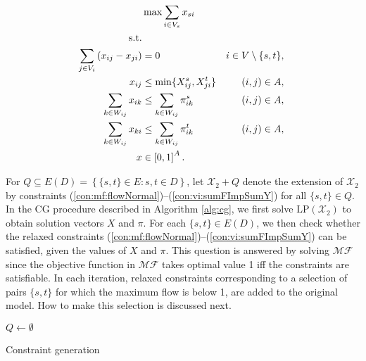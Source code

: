 \begin{subequations}\label{eq:mf}
\begin{align}
\label{objective:maxf} &\max\sum\limits_{i \in V_s} x_{si} \\ 
\text{s.t.}  \notag   \\
\label{con:maxf:flowNormal}  \sum\limits_{\substack{ j\in V_i}}\left(x_{ij}-x_{ji}\right) & = 0 & i\in V\setminus\{s,t\},\\
\label{con:maxf:fcapst}   x_{ij} &\leq \min\{X_{ij}^s, X_{ji}^t\}     &  (i,j)\in A,  \\ 	 
\label{con:maxf:sumFImpSumYst} \sum_{k\in W_{ij}}x_{ik} & \leq \sum_{k\in W_{ij}} \pi^{s}_{ik} & (i,j)\in A,\\
\label{con:maxf:sumFImpSumYts} \sum_{k\in W_{ij}}x_{ki} & \leq \sum_{k\in W_{ij}} \pi^{t}_{ik} & (i,j)\in A,\\
\label{con:maxf:fdim}x&\in\left[0,1\right]^{A}. 
\end{align}~
\end{subequations}  
  
For $Q\subseteq E(D)=\left\{\{s,t\}\in E: s,t\in D\right\}$, let $\mathcal{X}_2+Q$ denote the extension of $\mathcal{X}_2$ by constraints (\ref{con:mf:flowNormal})--(\ref{con:vi:sumFImpSumY}) for all $\{s,t\}\in Q$.
In the CG procedure described in Algorithm \ref{alg:cg},
we first solve $\text{LP}(\mathcal{X}_2)$ to obtain solution vectors $X$ and $\pi$.
For each $\{s,t\}\in E(D)$, we then check whether the relaxed constraints (\ref{con:mf:flowNormal})--(\ref{con:vi:sumFImpSumY}) can be satisfied,
given the values of $X$ and $\pi$.
This question is answered by solving $\mathcal{MF}$
since the objective function in $\mathcal{MF}$ takes optimal value 1 iff the constraints are satisfiable.
In each iteration,
relaxed constraints corresponding to a selection of pairs $\{s,t\}$ for which the maximum flow is below 1, are added to the original model.
How to make this selection is discussed next.

\begin{algorithm}
$Q\leftarrow\emptyset$\;
 \caption{Constraint generation}
\label{alg:cg}
\end{algorithm}

